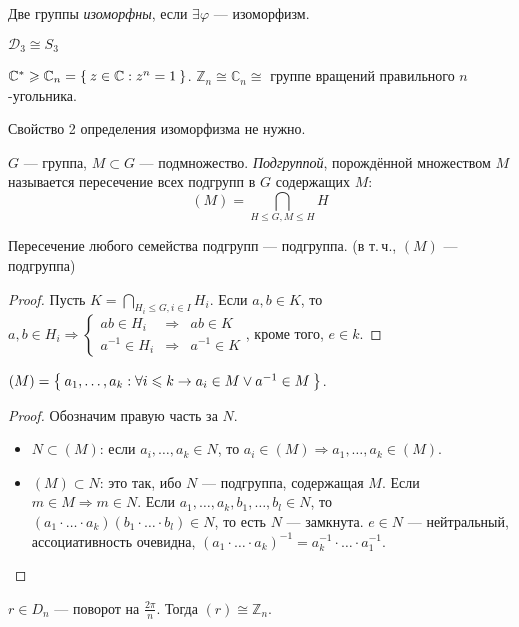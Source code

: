 \begin{define*}
  Две группы \emph{изоморфны}, если $\exists \varphi$ --- изоморфизм.
\end{define*}

\begin{example}
  $\mathcal{D}_3 \cong S_3$
\end{example}

\begin{example}
  $\mathbb{C}^* \geqslant \mathbb{C}_n = \Set{ z \in \mathbb{C}: z^n = 1 }$. 
  $\mathbb{Z}_n \cong \mathbb{C}_n \cong$ группе вращений правильного $n$-угольника.
\end{example}

\begin{exercise}
  Свойство 2 определения изоморфизма не нужно.
\end{exercise}

\begin{define*}
  $G$ --- группа, $M \subset G$ --- подмножество. \emph{Подгруппой}, порождённой множеством $M$ называется пересечение всех подгрупп в $G$ содержащих $M$:
  $$(M) = \bigcap_{H\le G, M\le H}H$$
\end{define*}

\begin{claim}
  Пересечение любого семейства подгрупп --- подгруппа. (в т.\,ч., $(M)$ --- подгруппа)
\end{claim}

\begin{proof}
  Пусть $K = \underset{H_i \le G, i \in I}{\bigcap}H_i$. Если $a, b \in K$, то 
  $a, b \in H_i \Rightarrow 
  \left\{ 
	\begin{aligned}
	  ab \in H_i &\Rightarrow& ab \in K\\ 
	  a^{-1} \in H_i &\Rightarrow& a^{-1} \in K
	\end{aligned}
  \right.$, кроме того, $e \in k$.
\end{proof}

\begin{claim}
  $(M) = \Set{ a_1, \ldots, a_k: \forall i \leqslant k \to a_i \in M \lor a^{-1} \in M }$.
\end{claim}

\begin{proof}
  Обозначим правую часть за $N$.

  \begin{itemize}
	\item $N \subset (M)$: если $a_i, \ldots, a_k \in N$, то $a_i \in (M) \Rightarrow a_1, \ldots, a_k \in (M)$.
	\item $(M) \subset N$: это так, ибо $N$ --- подгруппа, содержащая $M$.
		Если $m\in M\Rightarrow m\in N$. Если $a_{1},\ldots,a_{k},b_{1},\ldots,b_{l}\in N$,
		то $\left(a_{1}\cdot\ldots\cdot a_{k}\right)\left(b_{1}\cdot\ldots\cdot b_{l}\right)\in N$,
		то есть $N$ --- замкнута. $e\in N$ --- нейтральный, ассоциативность
		очевидна, $\left(a_{1}\cdot\ldots\cdot a_{k}\right)^{-1}=a_{k}^{-1}\cdot\ldots\cdot a_{1}^{-1}$.
  \end{itemize}
\end{proof}

\begin{example}
  $r\in D_{n}$ --- поворот на $\frac{2\pi}{n}$. Тогда $\left(r\right)\cong\mathbb{Z}_{n}$.
\end{example}




